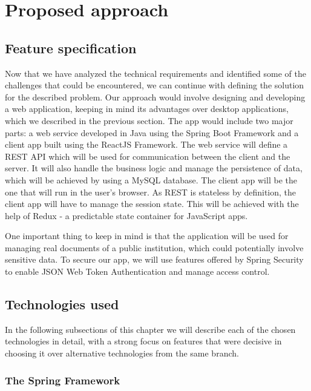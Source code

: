 \chapter{Proposed approach}
\label{chapter:proposedApproach}


\section{Feature specification}
\label{section:featureSpecification}

Now that we have analyzed the technical requirements and identified some of the challenges that could be encountered, we can continue with defining the solution for the described problem. Our approach would involve designing and developing a web application, keeping in mind its advantages over desktop applications, which we described in the previous section. The app would include two major parts: a web service developed in Java using the Spring Boot Framework and a client app built using the ReactJS Framework. The web service will define a REST API which will be used for communication between the client and the server. It will also handle the business logic and manage the persistence of data, which will be achieved by using a MySQL database. The client app will be the one that will run in the user's browser. As REST is stateless by definition, the client app will have to manage the session state. This will be achieved with the help of Redux - a predictable state container for JavaScript apps.

One important thing to keep in mind is that the application will be used for managing real documents of a public institution, which could potentially involve sensitive data. To secure our app, we will use features offered by Spring Security to enable JSON Web Token Authentication and manage access control.



\section{Technologies used}
\label{section:technologiesUsed}

In the following subsections of this chapter we will describe each of the chosen technologies in detail, with a strong focus on features that were decisive in choosing it over alternative technologies from the same branch.


\subsection{The Spring Framework}
\label{subsection:theSpringFramework}


